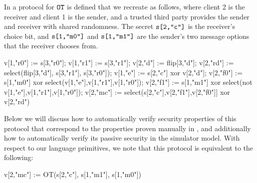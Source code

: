 \begin{example}
  \label{example-OT}
  In \cite{barthe2019probabilistic} a protocol for $\texttt{OT}$ is
  defined that we recreate as follows, where client 2 is the receiver
  and client 1 is the sender, and a trusted third party provides the
  sender and receiver with shared randomness. The secret $\texttt{s[2,"c"]}$
  is the receiver's choice bit, and $\texttt{s[1,"m0"]}$ and $\texttt{s[1,"m1"]}$
  are the sender's two message options that the receiver chooses from. 
  {\small
    \begin{verbatimtab}
      v[1,"r0"] := s[3,"r0"];
      v[1,"r1"] := s[3,"r1"];
      v[2,"d"] := flip[3,"d"];
      v[2,"rd"] := select(flip[3,"d"], s[3,"r1"], s[3,"r0"]);
      v[1,"e"] := s[2,"c"] xor v[2,"d"];
      v[2,"f0"] := s[1,"m0"] xor select(v[1,"e"],v[1,"r1"],v[1,"r0"]);
      v[2,"f1"] := s[1,"m1"] xor select(not v[1,"e"],v[1,"r1"],v[1,"r0"]);
      v[2,"mc"] := select(s[2,"c"],v[2,"f1"],v[2,"f0"]] xor v[2,"rd") \end{verbatimtab}
  }
Below we will discuss how to automatically verify security properties
of this protocol that correspond to the properties proven manually in
\cite{barthe2019probabilistic}, and additionally how to automatically
verify its passive security in the simulator model. With respect to
our language primitives, we note that this protocol is equivalent to
the following:
{\small
\begin{verbatimtab}  
      v[2,"mc"] := OT(s[2,"c"], s[1,"m1"], s[1,"m0"]) \end{verbatimtab}
}
\end{example}

